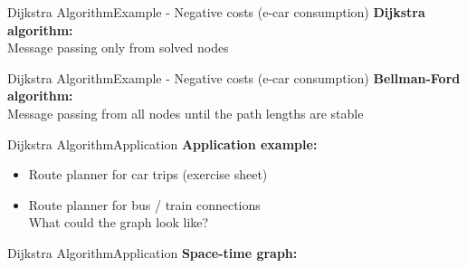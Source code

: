 
\begin{frame}{Dijkstra Algorithm}{Example - Negative costs (e-car consumption)}
  \textbf{Dijkstra algorithm:}\\
  Message passing only from solved nodes
  \begin{figure}
    \begin{adjustbox}{width=0.8\linewidth}
      \def\DijkstraAlgorithm{1}%
      
    \end{adjustbox}
  \end{figure}
\end{frame}


\begin{frame}{Dijkstra Algorithm}{Example - Negative costs (e-car consumption)}
  \textbf{Bellman-Ford algorithm:}\\
  Message passing from all nodes until the path lengths are stable
  \begin{figure}
    \begin{adjustbox}{width=0.8\linewidth}
      \def\DijkstraAlgorithm{0}%
      
    \end{adjustbox}
  \end{figure}
\end{frame}


\begin{frame}{Dijkstra Algorithm}{Application}
  \textbf{Application example:}
  \begin{itemize}
    \item
      Route planner for car trips (exercise sheet)
    \item
      Route planner for bus / train connections\\
      {\color{gray}What could the graph look like?}
  \end{itemize}
\end{frame}


\begin{frame}{Dijkstra Algorithm}{Application}
  \textbf{Space-time graph:}
  \begin{adjustbox}{width=1.1\linewidth}
    
  \end{adjustbox}
\end{frame}


